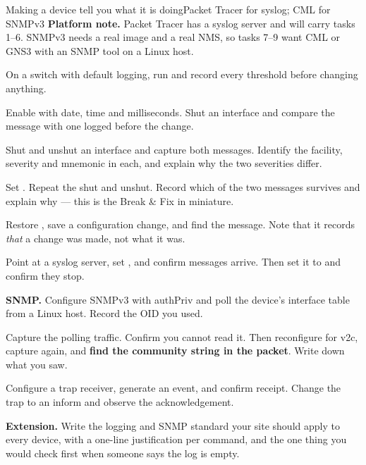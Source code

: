 \begin{lab}{Making a device tell you what it is doing}{Packet Tracer for syslog; CML for SNMPv3}
\textbf{Platform note.} Packet Tracer has a syslog server and will carry tasks
1--6. SNMPv3 needs a real image and a real NMS, so tasks 7--9 want CML or GNS3
with an SNMP tool on a Linux host.

\begin{tasks}
  \item On a switch with default logging, run  and record every
        threshold before changing anything.
  \item Enable  with date, time and milliseconds. Shut an
        interface and compare the message with one logged before the change.
  \item Shut and unshut an interface and capture both messages. Identify the
        facility, severity and mnemonic in each, and explain why the two
        severities differ.
  \item Set . Repeat the shut and unshut. Record
        which of the two messages survives and explain why --- this is the Break
        \& Fix in miniature.
  \item Restore , save a configuration
        change, and find the  message. Note that it records
        \emph{that} a change was made, not what it was.
  \item Point  at a syslog server, set , and confirm messages arrive. Then set it to
         and confirm they stop.
  \item \textbf{SNMP.} Configure SNMPv3 with authPriv and poll the device's
        interface table from a Linux host. Record the OID you used.
  \item Capture the polling traffic. Confirm you cannot read it. Then reconfigure
        for v2c, capture again, and \textbf{find the community string in the
        packet}. Write down what you saw.
  \item Configure a trap receiver, generate an event, and confirm receipt. Change
        the trap to an inform and observe the acknowledgement.
  \item \textbf{Extension.} Write the logging and SNMP standard your site should
        apply to every device, with a one-line justification per command, and the
        one thing you would check first when someone says the log is empty.
\end{tasks}
\end{lab}

